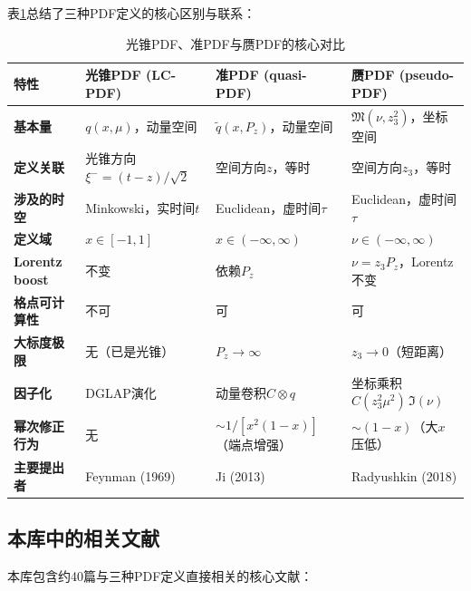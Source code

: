 \documentclass[12pt,a4paper]{ctexart}
\theoremstyle{definition}
\begin{document}
表\ref{tab:three_PDFs}总结了三种PDF定义的核心区别与联系：

\begin{table}[H]
\centering
\caption{光锥PDF、准PDF与赝PDF的核心对比}
\label{tab:three_PDFs}
\small
\begin{tabular}{p{2.2cm}p{3.3cm}p{3.3cm}p{3.3cm}}
\toprule
特性 & \textbf{光锥PDF} (LC-PDF) & \textbf{准PDF} (quasi-PDF) & \textbf{赝PDF} (pseudo-PDF) \\
\midrule
\textbf{基本量} & $q(x,\mu)$，动量空间 & $\tilde q(x, P_z)$，动量空间 & $\mathfrak{M}(\nu, z_3^2)$，坐标空间 \\
\textbf{定义关联} & 光锥方向$\xi^- = (t-z)/\sqrt{2}$ & 空间方向$z$，等时 & 空间方向$z_3$，等时 \\
\textbf{涉及的时空} & Minkowski，实时间$t$ & Euclidean，虚时间$\tau$ & Euclidean，虚时间$\tau$ \\
\textbf{定义域} & $x\in[-1,1]$ & $x\in(-\infty,\infty)$ & $\nu\in(-\infty,\infty)$ \\
\textbf{Lorentz boost} & 不变 & 依赖$P_z$ & $\nu = z_3 P_z$，Lorentz不变 \\
\textbf{格点可计算性} & 不可 & 可 & 可 \\
\textbf{大标度极限} & 无（已是光锥） & $P_z\to\infty$ & $z_3\to 0$（短距离） \\
\textbf{因子化} & DGLAP演化 & 动量卷积$C\otimes q$ & 坐标乘积$C(z_3^2\mu^2)\,\mathfrak{I}(\nu)$ \\
\textbf{幂次修正行为} & 无 & $\sim 1/[x^2(1-x)]$（端点增强） & $\sim (1-x)$（大$x$压低） \\
\textbf{主要提出者} & Feynman (1969) & Ji (2013) & Radyushkin (2018) \\
\bottomrule
\end{tabular}
\end{table}

\subsection{本库中的相关文献}

本库包含约40篇与三种PDF定义直接相关的核心文献：
\end{document}
